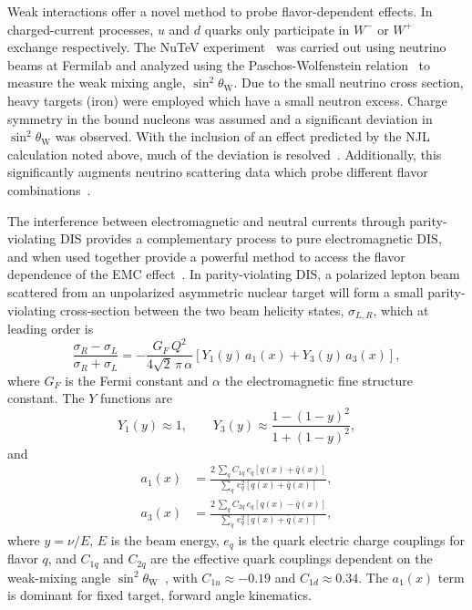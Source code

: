 Weak interactions offer a novel method to probe flavor-dependent effects.  In charged-current processes, $u$ and $d$ quarks only participate in $W^-$ or $W^+$ exchange respectively. The NuTeV experiment~\cite{Zeller:2001hh} was carried out using neutrino beams at Fermilab and analyzed using the Paschos-Wolfenstein relation~\cite{Paschos:1972kj} to measure the weak mixing angle, $\sin^2\theta_\mathrm{W}$.  Due to the small neutrino cross section, heavy targets (iron) were employed which have a small neutron excess.  Charge symmetry in the bound nucleons was assumed and a significant deviation in $\sin^2\theta_\mathrm{W}$ was observed.  With the inclusion of an effect predicted by the NJL calculation noted above, much of the deviation is resolved~\cite{Cloet:2009qs,Bentz:2009yy}.  Additionally, this significantly augments neutrino scattering data which probe different flavor combinations~\cite{Schienbein:2009kk}.

%
The interference between electromagnetic and neutral currents through parity-violating DIS provides a complementary process to pure electromagnetic DIS, and when used together provide a powerful method to access the flavor dependence of the EMC effect~\cite{Cloet:2012td}. In parity-violating DIS, a polarized lepton beam scattered from an unpolarized asymmetric nuclear target will form a small parity-violating cross-section between the two beam helicity states, $\sigma_{L,R}$, which at leading order is 
%
\begin{equation}
\frac{ \sigma_R - \sigma_L }{\sigma_R + \sigma_L} = -\frac{G_F\,Q^2}{4 \sqrt{2}\, \pi\, \alpha} 
\left[ Y_1(y)\,a_1(x) + Y_3(y)\,a_3(x) \right],
\label{eq:phy:apv}
\end{equation}
%
where $G_F$ is the Fermi constant and $\alpha$ the electromagnetic fine structure constant.  The $Y$ functions are
%
\begin{equation}
Y_1(y) \approx 1, \qquad Y_3(y) \approx \frac{1 - (1-y)^2}{1 + (1-y)^2},
\end{equation}
%
and
%
\begin{eqnarray}
a_1(x) &= \frac{2\,\sum_q C_{1q}\, e_q\left[q(x) + \bar{q}(x)\right]}
{\sum_q\, e_q^2\left[q(x) + \bar{q}(x)\right]}, \\
a_3(x) &= \frac{2\,\sum_q C_{2q}\, e_q\left[q(x) - \bar{q}(x)\right]}
{\sum_q\, e_q^2\left[q(x) + \bar{q}(x)\right]},
\end{eqnarray}
%
where $y=\nu/E$, $E$ is the beam energy, $e_q$ is the quark electric charge couplings for flavor $q$, and $C_{1q}$ and $C_{2q}$ are the effective quark couplings dependent on the weak-mixing angle $\sin^2\theta_\mathrm{W}$~\cite{Patrignani:2016xqp}, with $C_{1u} \approx -0.19$ and $C_{1d} \approx 0.34$. The $a_1(x)$ term is dominant for fixed target, forward angle kinematics. 

